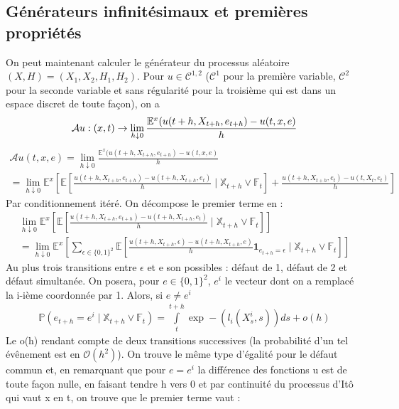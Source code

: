 \documentclass[a4paper]{article}
\begin{document}
\subsection{Générateurs infinitésimaux et premières propriétés}
On peut maintenant calculer le générateur du processus aléatoire $(X, H) = (X_{1}, X_{2}, H_{1}, H_{2})$. Pour $u \in \mathcal{C}^{1, 2}$ ($\mathcal{C}^{1}$ pour la première variable, $\mathcal{C}^{2}$ pour la seconde variable et sans régularité pour la troisième qui est dans un espace discret de toute façon), on a
\begin{equation*}
\mathcal{A}u : (x,t)
\rightarrow \space \lim_{h\downarrow 0} \frac {\mathbb{E}^{x}(u(t+h, X_{t+h}, e_{t+h}) - u(t,x,e)}{h}
\end{equation*}
\begin{multline*}
\mathcal{A}u(t,x,e) = \lim_{h\downarrow 0} \frac {\mathbb{E}^{x}(u(t+h, X_{t+h}, e_{t+h}) - u(t,x,e)}{h} \\
= \lim_{h\downarrow 0} \mathbb{E}^{x} \left[
\mathbb{E} \left[ \frac{u (t+h, X_{t+h}, e_{t+h}) - u(t+h, X_{t+h}, e_{t})}{h} \mid \mathbb{X}_{t+h} \vee \mathbb{F}_{t}  \right]
 +  \frac {u(t+h, X_{t+h}, e_{t}) -  u(t, X_{t}, e_{t})}{h} \right]
\end{multline*}
Par conditionnement itéré. On décompose le premier terme en :
\begin{multline*}
\lim_{h\downarrow 0} \mathbb{E}^{x} \left[
\mathbb{E} \left[ \frac{u (t+h, X_{t+h}, e_{t+h}) - u(t+h, X_{t+h}, e_{t})}{h} \mid \mathbb{X}_{t+h} \vee \mathbb{F}_{t}  \right]\right] \\
=  \lim_{h\downarrow 0} \mathbb{E}^{x} \left[ \sum \limits_{\epsilon \in \lbrace 0, 1 \rbrace^{2}} \mathbb{E} \left[ \frac{u (t+h, X_{t+h}, \epsilon) - u(t+h, X_{t+h}, e)}{h} \mathbf{1}_{e_{t+h} = \epsilon} \mid \mathbb{X}_{t+h} \vee \mathbb{F}_{t}  \right] \right]
\end{multline*}
Au plus trois transitions entre $\epsilon$ et e son possibles : défaut de 1, défaut de 2 et défaut simultanée. On posera, pour $e  \in \lbrace 0, 1 \rbrace^{2}$, $e^{i}$ le vecteur dont on a remplacé la i-ième coordonnée par 1. Alors, si $e \neq e^{i}$
\begin{eqnarray*}
\mathbb{P} \left(e_{t+h} = e^{i} \mid \mathbb{X}_{t+h} \vee \mathbb{F}_{t}  \right) = \int \limits_{t}^{t+h} \exp -(l_{i} (X^{i}_{s}, s))ds + o(h)
\end{eqnarray*}
Le o(h) rendant compte de deux transitions successives (la probabilité d'un tel évênement est en $\mathcal{O} (h^2)$). On trouve le même type d'égalité pour le défaut commun et, en remarquant que pour $e = e^{i}$ la différence des fonctions u est de toute façon nulle, en faisant tendre h vers 0 et par continuité du processus d'Itô qui vaut x en t, on trouve que le premier terme vaut :
\end{document}

